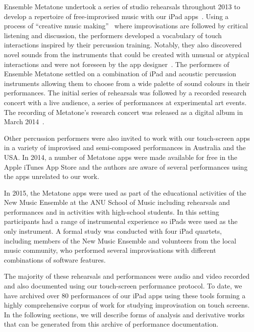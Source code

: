 \documentclass[graybox]{svmult}
\begin{document}
Ensemble Metatone undertook a series of studio rehearsals throughout
2013 to develop a repertoire of free-improvised music with our iPad
apps~\cite{Martin:2014jk}. Using a process of ``creative music
making''~\cite{Cahn:2005uq} where improvisations are followed by
critical listening and discussion, the performers developed a
vocabulary of touch interactions inspired by their percussion
training. Notably, they also discovered novel sounds from the
instruments that could be created with unusual or atypical
interactions and were not foreseen by the app
designer~\cite{Martin:2014cr}. The performers of Ensemble Metatone
settled on a combination of iPad and acoustic percussion instruments
allowing them to choose from a wide palette of sound colours in their
performances. The initial series of rehearsals was followed by a
recorded research concert with a live audience, a series of
performances at experimental art events. The recording of Metatone's
research concert was released as a digital album in March
2014~\cite{Ensemble-Metatone:2014sf}.

Other percussion performers were also invited to work with our
touch-screen apps in a variety of improvised and semi-composed
performances in Australia and the USA. In 2014, a number of Metatone
apps were made available for free in the Apple iTunes App Store and
the authors are aware of several performances using the apps unrelated
to our work.

In 2015, the Metatone apps were used as part of the educational
activities of the New Music Ensemble at the ANU School of Music
including rehearsals and performances and in activities with
high-school students. In this setting participants had a range of
instrumental experience so iPads were used as the only instrument. A
formal study was conducted with four iPad quartets, including members
of the New Music Ensemble and volunteers from the local music
community, who performed several improvisations with different
combinations of software features.

The majority of these rehearsals and performances were audio and video
recorded and also documented using our touch-screen performance
protocol. To date, we have archived over 80 performances of our iPad
apps using these tools forming a highly comprehensive corpus of work
for studying improvisation on touch screens. In the following
sections, we will describe forms of analysis and derivative works that
can be generated from this archive of performance documentation.

\end{document}
